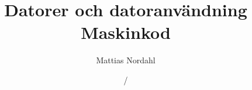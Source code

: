 \documentclass[handout]{beamer}
\author[]{Mattias Nordahl}
\institute{\url{mattias.nordahl@cs.lth.se}}
\date{}
\begin{document}
 

\title{Datorer och datoranvändning\\Maskinkod} 

\frame[plain]{
\maketitle

\vspace{-2\baselineskip}
}

\date{\the\year/\the\numexpr{}} 


\end{document}

